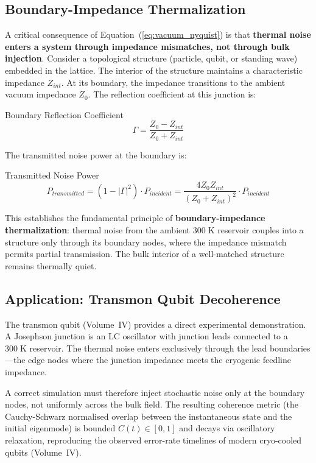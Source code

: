 \subsection{Boundary-Impedance Thermalization}

A critical consequence of Equation~(\ref{eq:vacuum_nyquist}) is that \textbf{thermal noise enters a system through impedance mismatches, not through bulk injection}. Consider a topological structure (particle, qubit, or standing wave) embedded in the lattice. The interior of the structure maintains a characteristic impedance $Z_{int}$. At its boundary, the impedance transitions to the ambient vacuum impedance $Z_0$. The reflection coefficient at this junction is:
\begin{resultbox}{Boundary Reflection Coefficient}
\begin{equation}
    \Gamma = \frac{Z_0 - Z_{int}}{Z_0 + Z_{int}}
    \label{eq:reflection_coefficient}
\end{equation}
\end{resultbox}

The transmitted noise power at the boundary is:
\begin{resultbox}{Transmitted Noise Power}
\begin{equation}
    P_{transmitted} = (1 - |\Gamma|^2) \cdot P_{incident} = \frac{4 Z_0 Z_{int}}{(Z_0 + Z_{int})^2} \cdot P_{incident}
    \label{eq:transmitted_power}
\end{equation}
\end{resultbox}

This establishes the fundamental principle of \textbf{boundary-impedance thermalization}: thermal noise from the ambient $300\;\text{K}$ reservoir couples into a structure only through its boundary nodes, where the impedance mismatch permits partial transmission. The bulk interior of a well-matched structure remains thermally quiet.

\subsection{Application: Transmon Qubit Decoherence}

The transmon qubit (Volume~IV) provides a direct experimental demonstration. A Josephson junction is an LC oscillator with junction leads connected to a $300\;\text{K}$ reservoir. The thermal noise enters exclusively through the lead boundaries---the edge nodes where the junction impedance meets the cryogenic feedline impedance.

A correct simulation must therefore inject stochastic noise only at the boundary nodes, not uniformly across the bulk field. The resulting coherence metric (the Cauchy-Schwarz normalised overlap between the instantaneous state and the initial eigenmode) is bounded $C(t) \in [0, 1]$ and decays via oscillatory relaxation, reproducing the observed error-rate timelines of modern cryo-cooled qubits (Volume~IV).

